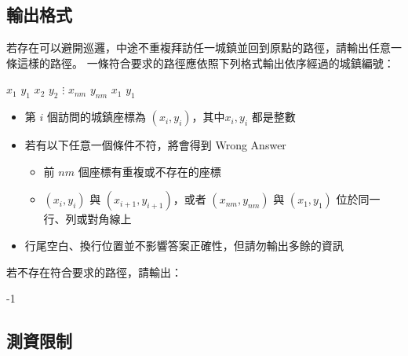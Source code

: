 \subsection{輸出格式}

若存在可以避開巡邏，中途不重複拜訪任一城鎮並回到原點的路徑，請輸出任意一條這樣的路徑。
一條符合要求的路徑應依照下列格式輸出依序經過的城鎮編號：

\begin{format}
\f{
$x_1$ $y_1$
$x_2$ $y_2$
$\vdots$
$x_{nm}$ $y_{nm}$
$x_1$ $y_1$
}
\end{format}

\begin{itemize}
\tightlist
\item
  第 \begin{math}i\end{math} 個訪問的城鎮座標為
  \begin{math}(x_i, y_i)\end{math}，其中\begin{math}x_i, y_i\end{math}
  都是整數
\item
  若有以下任意一個條件不符，將會得到 Wrong Answer

  \begin{itemize}
  \tightlist
  \item
    前 \begin{math}nm\end{math} 個座標有重複或不存在的座標
  \item
    \begin{math}(x_i, y_i)\end{math} 與
    \begin{math}(x_{i+1}, y_{i+1})\end{math}，或者
    \begin{math}(x_{nm}, y_{nm})\end{math} 與
    \begin{math}(x_1, y_1)\end{math} 位於同一行、列或對角線上
  \end{itemize}
\item
  行尾空白、換行位置並不影響答案正確性，但請勿輸出多餘的資訊
\end{itemize}

若不存在符合要求的路徑，請輸出：

\begin{format}
\f{
-1
}
\end{format}

\subsection{測資限制}

